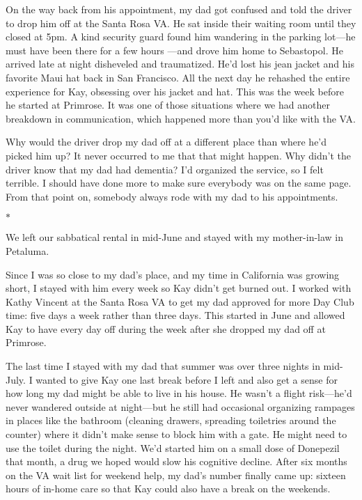 \documentclass[12pt]{book}
\begin{document}
On the way back from his appointment, my dad got confused and told the driver to drop him off at the Santa Rosa VA. He sat inside their waiting room until they closed at 5pm. A kind security guard found him wandering in the parking lot---he must have been there for a few hours ---and drove him home to Sebastopol. He arrived late at night disheveled and traumatized. He'd lost his jean jacket and his favorite Maui hat back in San Francisco. All the next day he rehashed the entire experience for Kay, obsessing over his jacket and hat. This was the week before he started at Primrose. It was one of those situations where we had another breakdown in communication, which happened more than you'd like with the VA.

Why would the driver drop my dad off at a different place than where he'd picked him up? It never occurred to me that that might happen. Why didn't the driver know that my dad had dementia? I'd organized the service, so I felt terrible. I should have done more to make sure everybody was on the same page. From that point on, somebody always rode with my dad to his appointments.

\begin{center}$*$\end{center}

We left our sabbatical rental in mid-June and stayed with my mother-in-law in Petaluma.

Since I was so close to my dad's place, and my time in California was growing short, I stayed with him every week so Kay didn't get burned out. I worked with Kathy Vincent at the Santa Rosa VA to get my dad approved for more Day Club time: five days a week rather than three days. This started in June and allowed Kay to have every day off during the week after she dropped my dad off at Primrose.

The last time I stayed with my dad that summer was over three nights in mid-July. I wanted to give Kay one last break before I left and also get a sense for how long my dad might be able to live in his house. He wasn't a flight risk---he'd never wandered outside at night---but he still had occasional organizing rampages in places like the bathroom (cleaning drawers, spreading toiletries around the counter) where it didn't make sense to block him with a gate. He might need to use the toilet during the night. We'd started him on a small dose of Donepezil that month, a drug we hoped would slow his cognitive decline. After six months on the VA wait list for weekend help, my dad's number finally came up: sixteen hours of in-home care so that Kay could also have a break on the weekends.
\end{document}
